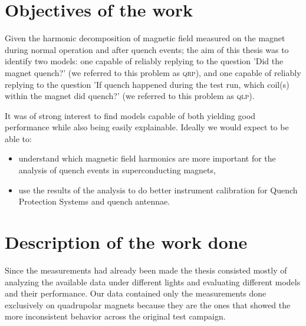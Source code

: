 \documentclass[a4paper, notitlepage]{article}
\begin{document}
\section{Objectives of the work}
Given the harmonic decomposition of magnetic field measured on the magnet during normal operation
and after quench events; the aim of this thesis was to identify two models: one capable of reliably
replying to the question 'Did the magnet quench?' (we referred to this problem as \textsc{qrp}), and
one capable of reliably replying to the question 'If quench happened during the test run, which
coil(s) within the magnet did quench?' (we referred to this problem as \textsc{qlp}).

It was of strong interest to find models capable of both yielding good performance while also being
easily explainable. Ideally we would expect to be able to:
\begin{itemize}
	\item understand which magnetic field harmonics are more important for the analysis of
	      quench events in superconducting magnets,
	\item use the results of the analysis to do better instrument calibration for Quench
	      Protection Systems and quench antennae.
\end{itemize}

\section{Description of the work done}
Since the measurements had already been made the thesis consisted mostly of analyzing the available
data under different lights and evaluating different models and their performance. Our data
contained only the measurements done exclusively on quadrupolar magnets because they are the ones
that showed the more inconsistent behavior across the original test campaign.

\end{document}
